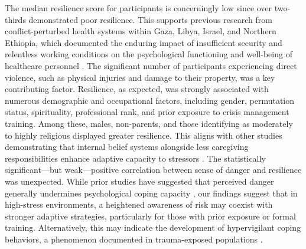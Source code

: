 \documentclass[12pt]{article}
\begin{document}
The median resilience score for participants is concerningly low since over two-thirds demonstrated poor resilience. This supports previous research from conflict-perturbed health systems within Gaza, Libya, Israel, and Northern Ethiopia, which documented the enduring impact of insufficient security and relentless working conditions on the psychological functioning and well-being of healthcare personnel \cite{sberro2023resilience, alnassar2023mental, abugraga2023health, bashir2022religiosity}.
The significant number of participants experiencing direct violence, such as physical injuries and damage to their property, was a key contributing factor. Resilience, as expected, was strongly associated with numerous demographic and occupational factors, including gender, permutation status, spirituality, professional rank, and prior exposure to crisis management training. Among these, males, non-parents, and those identifying as moderately to highly religious displayed greater resilience. This aligns with other studies demonstrating that internal belief systems alongside less caregiving responsibilities enhance adaptive capacity to stressors \cite{zaman2023parental, saleh2024barriers}.
The statistically significant—but weak—positive correlation between sense of danger and resilience was unexpected. While prior studies have suggested that perceived danger generally undermines psychological coping capacity \cite{tadesse2023exposure}, our findings suggest that in high-stress environments, a heightened awareness of risk may coexist with stronger adaptive strategies, particularly for those with prior exposure or formal training. Alternatively, this may indicate the development of hypervigilant coping behaviors, a phenomenon documented in trauma-exposed populations \cite{stewart2022hypervigilance}.

\nocite{*}

\end{document}
